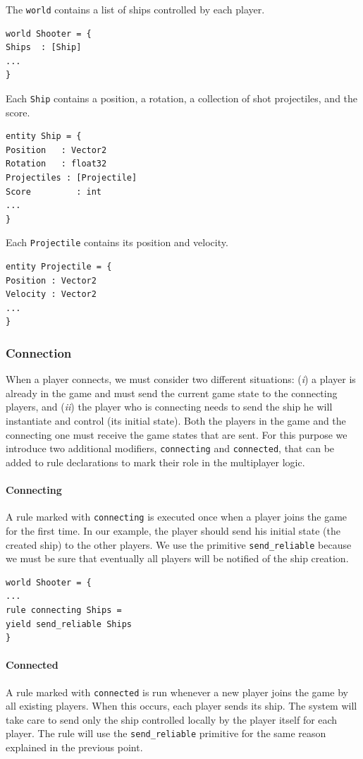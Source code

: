 The \texttt{world} contains a list of ships controlled by each player.
\begin{lstlisting}
world Shooter = {
Ships  : [Ship]
...
}
\end{lstlisting}

Each \texttt{Ship} contains a position, a rotation, a collection of shot projectiles, and the score.
\begin{lstlisting}
entity Ship = {
Position   : Vector2
Rotation   : float32
Projectiles : [Projectile]
Score		  : int
...
}

\end{lstlisting}

Each \texttt{Projectile} contains its position and velocity.

\begin{lstlisting}
entity Projectile = {
Position : Vector2
Velocity : Vector2
...
}
\end{lstlisting}

\subsubsection{Connection}
When a player connects, we must consider two different situations: (\textit{i}) a player is already in the game and must send the current game state to the connecting players, and (\textit{ii}) the player who is connecting needs to send the ship he will instantiate and control (its initial state). Both the players in the game and the connecting one must receive the game states that are sent. For this purpose we introduce two additional modifiers, \texttt{connecting} and \texttt{connected}, that can be added to rule declarations to mark their role in the multiplayer logic.

\paragraph{Connecting} A rule marked with \texttt{connecting} is executed once when a player joins the game for the first time. In our example, the player should send his initial state (the created ship) to the other players. We use the primitive \texttt{send\_reliable} because we must be sure that eventually all players will be notified of the ship creation.
\begin{lstlisting}
world Shooter = {
...
rule connecting Ships =
yield send_reliable Ships
}
\end{lstlisting}

\paragraph{Connected} A rule marked with \texttt{connected} is run whenever a new player joins the game by all existing players. When this occurs, each player sends its ship. The system will take care to send only the ship controlled locally by the player itself for each player. The rule will use the \texttt{send\_reliable} primitive for the same reason explained in the previous point.

